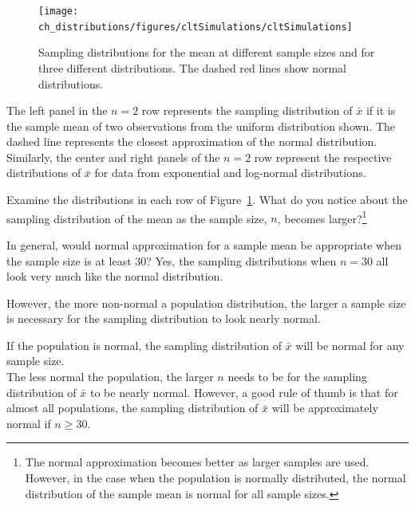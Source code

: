 \begin{figure}
   \centering
   \texttt{[image: ch\_distributions/figures/cltSimulations/cltSimulations]}
   \caption{Sampling distributions for the mean at different sample sizes and for three different distributions. The dashed red lines show normal distributions.}
   \label{cltSimulations}
\end{figure}

The left panel in the $n=2$ row represents the sampling distribution of $\bar{x}$ if it is the sample mean of two observations from the uniform distribution shown. The dashed line represents the closest approximation of the normal distribution. Similarly, the center and right panels of the $n=2$ row represent the respective distributions of $\bar{x}$ for data from exponential and log-normal distributions.

\begin{exercise}
Examine the distributions in each row of Figure~\ref{cltSimulations}. What do you notice about the sampling distribution of the mean as the sample size, $n$, becomes larger?\footnote{The normal approximation becomes better as larger samples are used. However, in the case when the population is normally distributed, the normal distribution of the sample mean is normal for all sample sizes.}
\end{exercise}

\begin{example}{In general, would normal approximation for a sample mean be appropriate when the sample size is at least 30?}
Yes, the sampling distributions when $n = 30$ all look very much like the normal distribution.

However, the more non-normal a population distribution, the larger a sample size is necessary for the sampling distribution to look nearly normal.
\end{example}

\begin{termBox}{
If the population is normal, the sampling distribution of $\bar{x}$ will be normal for any sample size. \\[2mm]
The less normal the population, the larger $n$ needs to be for the sampling distribution of $\bar{x}$ to be nearly normal.  However, a good rule of thumb is that for almost all populations, the sampling distribution of $\bar{x}$ will be approximately normal if $n \ge 30$.}
\end{termBox}

